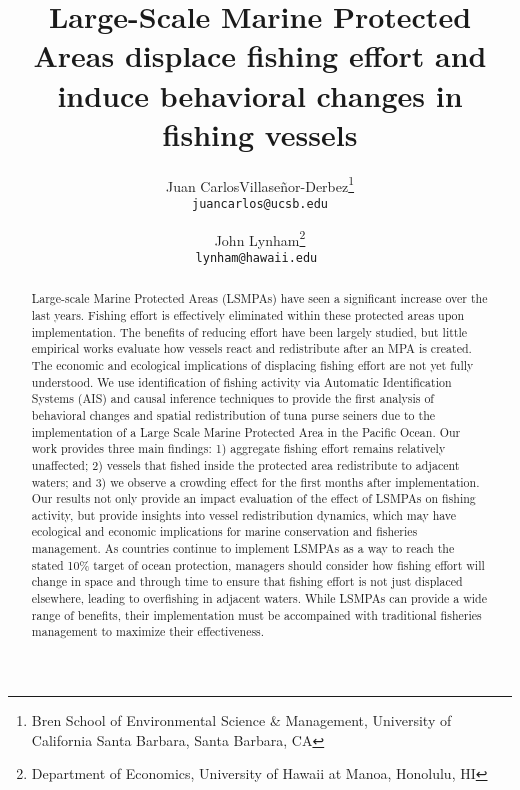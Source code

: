 \documentclass[11pt,english]{article}
\title{Large-Scale Marine Protected Areas displace fishing
effort and induce behavioral changes in fishing vessels}
\author{
  Juan CarlosVillase\~{n}or-Derbez\footnote{Bren School of Environmental Science \& Management, University of California Santa Barbara, Santa Barbara, CA} \\
  \texttt{juancarlos@ucsb.edu}
  \and
 John Lynham\footnote{Department of Economics, University of Hawaii at Manoa, Honolulu, HI}\\
  \texttt{lynham@hawaii.edu }
}
\date{}
\begin{document}
\maketitle
\begin{abstract}
Large-scale Marine Protected Areas (LSMPAs) have seen a significant
increase over the last years. Fishing effort is effectively eliminated
within these protected areas upon implementation. The benefits of
reducing effort have been largely studied, but little empirical works
evaluate how vessels react and redistribute after an MPA is created. The
economic and ecological implications of displacing fishing effort are
not yet fully understood. We use identification of fishing activity via
Automatic Identification Systems (AIS) and causal inference techniques
to provide the first analysis of behavioral changes and spatial
redistribution of tuna purse seiners due to the implementation of a
Large Scale Marine Protected Area in the Pacific Ocean. Our work
provides three main findings: 1) aggregate fishing effort remains
relatively unaffected; 2) vessels that fished inside the protected area
redistribute to adjacent waters; and 3) we observe a crowding effect for
the first months after implementation. Our results not only provide an
impact evaluation of the effect of LSMPAs on fishing activity, but
provide insights into vessel redistribution dynamics, which may have
ecological and economic implications for marine conservation and fisheries
management. As countries continue to implement LSMPAs as a way to
reach the stated 10\% target of ocean protection, managers should
consider how fishing effort will change in space and through time to
ensure that fishing effort is not just displaced elsewhere, leading to
overfishing in adjacent waters. While LSMPAs can provide a wide
range of benefits, their implementation must be accompained with
traditional fisheries management to maximize their effectiveness.
\end{abstract}
\end{document}
